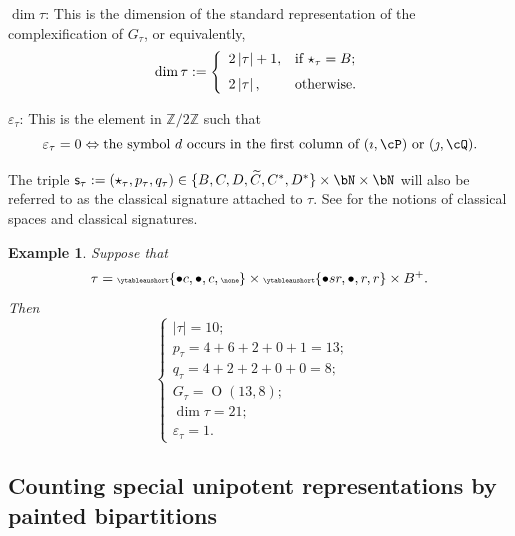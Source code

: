 \documentclass[11pt,a4paper]{amsart}
\def\abs#1{\left|{#1}\right|}
\newcommand{\oO}{\operatorname{O}}
\newcommand{\Z}{\mathbb{Z}}
\newcommand{\be}{\begin {equation}}
\newcommand{\ee}{\end {equation}}
\numberwithin{equation}{section}
\newtheorem{eg}[thm]{Example}
\theoremstyle{remark}
\let\ytb=\ytableaushort
\newcommand{\tytb}[1]{{\tiny\ytb{#1}}}
\begin{document}
\smallskip


 \smallskip

\noindent $\dim \tau$:
This is the dimension of the standard representation of the complexification of $G_\tau$, or equivalently,
 \begin{equation}\label{def:dimtau}
 \dim \tau:= \left\{
     \begin{array}{ll}
          2\abs{ \tau}+1, &\hbox{if $\star_\tau=B$}; \medskip\\
         2 \abs{\tau}, &\hbox{otherwise}.
            \end{array}
   \right.
 \end{equation}

 \smallskip

 \smallskip


  \noindent $\varepsilon_\tau$:
This is the element in $\Z/2\Z$ such that
\be\label{epsilontau}
  \varepsilon_\tau=0\Leftrightarrow  \textrm{the symbol $d$ occurs in the first column of $( \imath, \cP)$ or $(\jmath, \cQ)$}.
\ee

 \smallskip


The triple $\mathsf s_{\tau}:=(\star_{\tau}, p_{\tau},q_{\tau})\in  \{B,C,D, \widetilde C, C^*, D^*\}\times \bN\times \bN$ will also be referred to as the classical signature attached to $\tau$. See  for the notions of classical spaces and classical signatures.
\smallskip

\begin{eg} Suppose that
\[
\tau= \tytb{\bullet c ,\bullet , c,\none } \times \tytb{\bullet s r ,\bullet ,r, r }\times B^+.
\]
Then
\[
\begin{cases}
\abs{\tau}=10;\\
 p_\tau=4+6+2+0+1=13; \quad\\
 q_\tau=4+2+2+0+0=8; \quad \\
 G_\tau=\oO(13,8);\quad \\
 \dim \tau=21;\\
 \varepsilon_\tau=1.
 \end{cases}
 \]

\end{eg}


\subsection{Counting special unipotent representations by painted bipartitions}\label{subsec:countbip}
\end{document}
